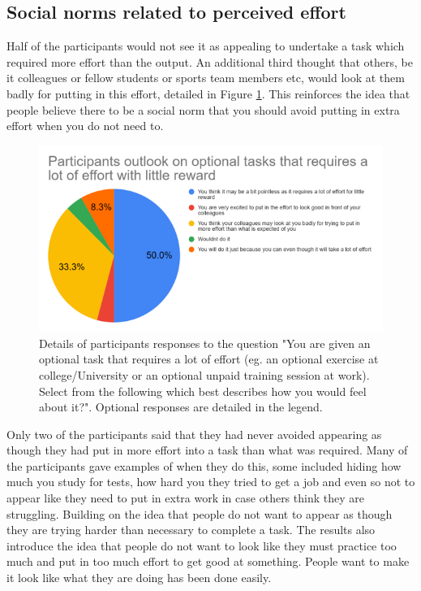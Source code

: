 \documentclass{l4proj}
\begin{document}
\subsection{Social norms related to perceived effort}

Half of the participants would not see it as appealing to undertake a task which required more effort than the output. An additional third thought that others, be it colleagues or fellow students or sports team members etc, would look at them badly for putting in this effort, detailed in Figure \ref{fig:reward}. This reinforces the idea that people believe there to be a social norm that you should avoid putting in extra effort when you do not need to. 

\begin{figure}[!htb]
    \centering
    \includegraphics[width=\textwidth]{images/littleReward.png}
        \caption{Details of participants responses to the question "You are given an optional task that requires a lot of effort (eg. an optional exercise at college/University or an optional unpaid training session at work). Select from the following which best describes how you would feel about it?". Optional responses are detailed in the legend.}
        \label{fig:reward}
\end{figure}

Only two of the participants said that they had never avoided appearing as though they had put in more effort into a task than what was required. Many of the participants gave examples of when they do this, some included hiding how much you study for tests, how hard you they tried to get a job and even so not to appear like they need to put in extra work in case others think they are struggling. Building on the idea that people do not want to appear as though they are trying harder than necessary to complete a task. The results also introduce the idea that people do not want to look like they must practice too much and put in too much effort to get good at something. People want to make it look like what they are doing has been done easily. 
\end{document}

